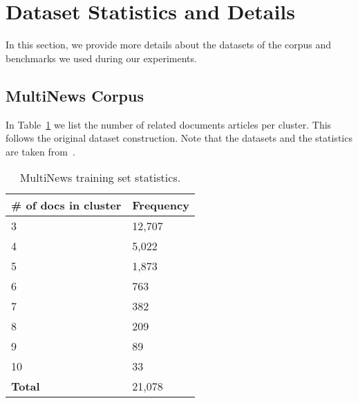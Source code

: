 \documentclass[11pt,a4paper]{article}
\begin{document}
\clearpage
\appendix
\section{Dataset Statistics and Details}

In this section, we provide more details about the datasets of the corpus and benchmarks we used during our experiments.

\subsection{MultiNews Corpus}
\label{subsec:multinews_data}
In Table~\ref{tab:multi_stats} we list the number of related documents articles per cluster. This follows the original dataset construction. Note that the datasets and the statistics are taken from~\citet{fabbri-etal-2019-multi}.
\begin{table}[htp]
\centering
    \small
  \def\arraystretch{1.12}\tabcolsep=7pt    
\begin{tabular}{ll}
                      \toprule
\# of docs in cluster               &  Frequency            \\ \toprule
 3 & 12,707      \\
 4 & 5,022     \\
 5 &  1,873      \\
 6 & 763     \\
 7 & 382     \\
 8 & 209     \\
 9 & 89     \\
10 & 33     \\
\midrule
\textbf{Total}  & 21,078     \\

\bottomrule
\end{tabular}
\caption{MultiNews training set statistics.}\smallskip 
\label{tab:multi_stats}
\end{table}
 
\end{document}
